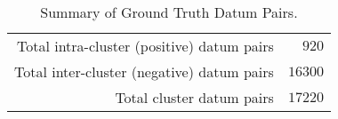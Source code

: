 \begin{table}[htp]
	\begin{center}
	\caption{Summary of Ground Truth Datum Pairs.}
	\label{tab:ch6_table_pair_summary}
		\begin{tabular}{r r}
		\toprule
			Total intra-cluster (positive) datum pairs & $920$\\
			Total inter-cluster (negative) datum pairs & $16300$\\
			\midrule Total cluster datum pairs & $17220$\\
		\bottomrule
		\end{tabular}
	\end{center}
\end{table}